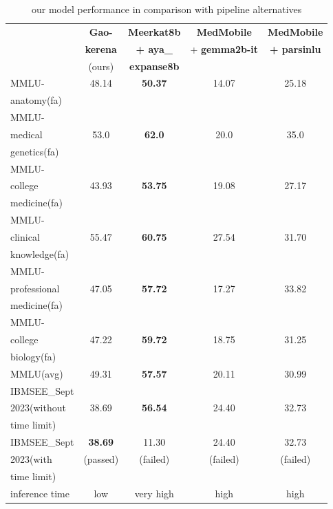 \documentclass[conference]{IEEEtran}
\begin{document}
\begin{table}[ht]
	\centering
	\caption{our model performance 
		in comparison with pipeline alternatives}
	\begin{tabular}{|l|c|c|c|c|}  %
		\hline
		\textbf{} & \textbf{Gao-} & \textbf{Meerkat8b}
		& \textbf{MedMobile} & \textbf{MedMobile} \\ 
		& \textbf{kerena} & \textbf{+ aya\_} & + \textbf{gemma2b-it} & \textbf{+ parsinlu} \\
		& (ours) & \textbf{expanse8b}  &  &  \\ \hline
		MMLU- & 48.14 & \textbf{50.37} & 14.07 & 25.18 \\ 
		anatomy(fa) &  &  &  &  \\ \hline
		MMLU- &  &   &  &  \\
		medical & 53.0 & \textbf{62.0} & 20.0 & 35.0 \\ 
		genetics(fa) &  &  &  &  \\ \hline
		MMLU- &  &  &  &  \\
		college & 43.93 & \textbf{53.75} & 19.08 & 27.17 \\
		medicine(fa) &  &  &  &  \\ \hline
		MMLU- &  &  &  &  \\
		clinical& 55.47 & \textbf{60.75} & 27.54 & 31.70 \\
		knowledge(fa)&  &  &  &  \\ \hline
		MMLU- &  & &  &  \\
		professional& 47.05 & \textbf{57.72} & 17.27 & 33.82 \\ 
		medicine(fa)&  &  &  &  \\ \hline
		MMLU- &  &  &  &  \\
		college& 47.22 & \textbf{59.72} & 18.75 & 31.25 \\
		biology(fa)&  &  &  &  \\ \hline
		MMLU(avg) & 49.31 & \textbf{57.57} & 20.11 & 30.99 \\ \hline
		IBMSEE\_Sept &  &  &  &  \\ 
		2023(without & 38.69 & \textbf{56.54} & 24.40 & 32.73 \\  
		time limit) &  &  &  &  \\  \hline
		IBMSEE\_Sept & \textbf{38.69} & 11.30 & 24.40 & 32.73 \\ 
		2023(with & (passed) & (failed) & (failed) & (failed) \\  
		time limit) &  &  &  &  \\  \hline
		inference time & low & very high & high & high \\  \hline
	\end{tabular}
	\label{tab:model_results_on_mcqa_vs_pipeline_alternative}
\end{table}
\end{document}
